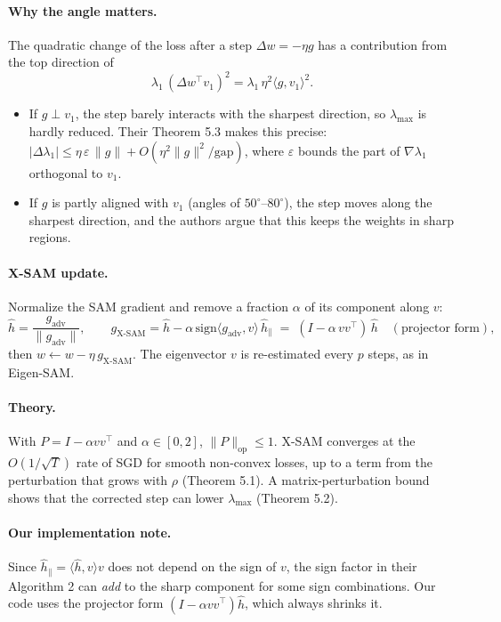 \documentclass[11pt]{article}
\newcommand{\lmax}{\lambda_{\max}}
\newcommand{\gp}{g_{\mathrm{adv}}}
\theoremstyle{plain}
\begin{document}
\paragraph{Why the angle matters.} The quadratic change of the loss after a step $\Delta w = -\eta g$ has a contribution from the top direction of
\begin{equation}
  \lambda_1\, (\Delta w^\top v_1)^2 = \lambda_1\, \eta^2 \langle g, v_1\rangle^2 .
\end{equation}
\begin{itemize}
  \item If $g \perp v_1$, the step barely interacts with the sharpest direction, so $\lmax$ is hardly reduced. Their Theorem 5.3 makes this precise:
        $|\Delta\lambda_1| \le \eta\,\varepsilon\,\|g\| + O(\eta^2\|g\|^2/\text{gap})$, where $\varepsilon$ bounds the part of $\nabla\lambda_1$ orthogonal to $v_1$.
  \item If $g$ is partly aligned with $v_1$ (angles of $50^\circ$--$80^\circ$), the step moves along the sharpest direction, and the authors argue that this keeps the weights in sharp regions.
\end{itemize}

\paragraph{X-SAM update.} Normalize the SAM gradient and remove a fraction $\alpha$ of its component along $v$:
\begin{equation}
  \hat h = \frac{\gp}{\|\gp\|}, \qquad
  g_{\mathrm{X\text{-}SAM}} = \hat h - \alpha\,\mathrm{sign}\langle \gp, v\rangle\, \hat h_\parallel
  \;=\; (I - \alpha\, v v^\top)\,\hat h \quad (\text{projector form}),
\end{equation}
then $w \leftarrow w - \eta\, g_{\mathrm{X\text{-}SAM}}$. The eigenvector $v$ is re-estimated every $p$ steps, as in Eigen-SAM.

\paragraph{Theory.} With $P = I - \alpha vv^\top$ and $\alpha\in[0,2]$, $\|P\|_{\mathrm{op}}\le 1$. X-SAM converges at the $O(1/\sqrt T)$ rate of SGD
for smooth non-convex losses, up to a term from the perturbation that grows with $\rho$ (Theorem 5.1). A matrix-perturbation bound shows that the corrected step
can lower $\lmax$ (Theorem 5.2).

\paragraph{Our implementation note.} Since $\hat h_\parallel = \langle\hat h, v\rangle v$ does not depend on the sign of $v$, the sign factor in their Algorithm 2 can
\emph{add} to the sharp component for some sign combinations. Our code uses the projector form $(I - \alpha vv^\top)\hat h$, which always shrinks it.
\end{document}

